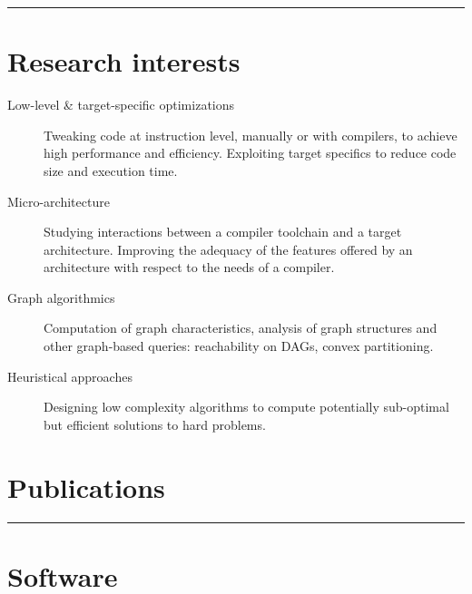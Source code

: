 \documentclass[english,9pt]{extarticle}
\begin{document}
\noindent\rule{\textwidth}{1pt}

\section*{Research interests}
\begin{adjustwidth}{1em}{}
	\begin{description}
		\item[Low-level \& target-specific optimizations] Tweaking code at instruction level, manually
			or with compilers, to achieve high performance and efficiency. Exploiting target specifics to
			reduce code size and execution time.
		\item[Micro-architecture] Studying interactions between a compiler toolchain and a target
			architecture. Improving the adequacy of the features offered by an architecture with respect
			to the needs of a compiler.
		\item[Graph algorithmics] Computation of graph characteristics, analysis of graph structures and
			other graph-based queries: reachability on DAGs, convex partitioning.
		\item[Heuristical approaches] Designing low complexity algorithms to compute potentially
			sub-optimal but efficient solutions to hard problems.
	\end{description}
\end{adjustwidth}


\section*{Publications}
\nocite{*}
\printbibliography[heading=subbibliography,title=Conferences \& workshops,type=inproceedings]
\printbibliography[heading=subbibliography,title=Thesis,type=thesis]
\printbibliography[heading=subbibliography,title=Patents,type=misc]


\noindent\rule{\textwidth}{1pt}

\section*{Software}
\end{document}
